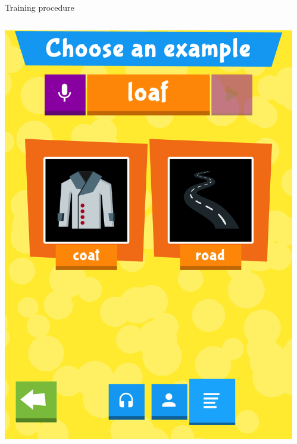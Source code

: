 \documentclass[final,xcolor={cmyk,hyperref}]{beamer}
\begin{document}
\begin{frame}[t]
\begin{columns}[t]
\begin{column}{0.45\linewidth}
\begin{block}{Training procedure}
\begin{columns}
\begin{column}{\screenshotwidth}
    \includegraphics[width=\linewidth]{images/CALVin-screenshots/jpgs/choose_example}
  \end{column}
  \begin{column}{\screenshotwidth}

\end{column}
\end{columns}
\end{block}
\end{column}
\end{columns}
\end{frame}
\end{document}
